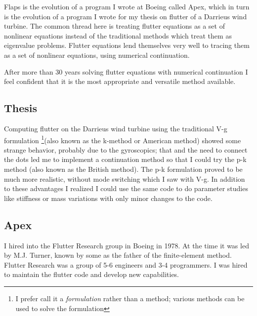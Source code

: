 \documentclass[11pt,openany,twoside]{book}
\numberwithin{equation}{section}		%
\begin{document}
Flaps is the evolution of a program I wrote at Boeing called Apex,
which in turn is the evolution of a program I wrote for my thesis on
flutter of a Darrieus wind turbine.
The common thread here is treating flutter equations as a set of nonlinear
equations instead of the traditional methods which treat them as
eigenvalue problems. Flutter equations lend themselves very well to
tracing them as a set of nonlinear equations, using numerical continuation.

After more than 30 years solving flutter equations with numerical continuation
I feel confident that it is the most appropriate and versatile method available.

\subsection{Thesis}
Computing flutter on the Darrieus wind turbine using the traditional
V-g formulation \footnote{I prefer call it a \emph{formulation} rather than a method;
various methods can be used to solve the formulation}(also known as the k-method or
American method) showed some strange behavior, probably due to the gyroscopics;
that and the need to connect the dots led me to implement a continuation method so
that I could try the p-k method \cite{hassig1971approximate} (also known as the British method).
The p-k formulation proved to be
much more realistic, without mode switching which I saw with V-g.
In addition to these advantages I realized I could use the same code
to do parameter studies like stiffness or mass variations with only
minor changes to the code.

\subsection{Apex}
I hired into the Flutter Research group in Boeing in 1978. At the time it was
led by M.J. Turner, known by some as the father of the finite-element method.
Flutter Research was a group of 5-6 engineers and 3-4 programmers.
I was hired to maintain the flutter code and develop new capabilities.
\end{document}
